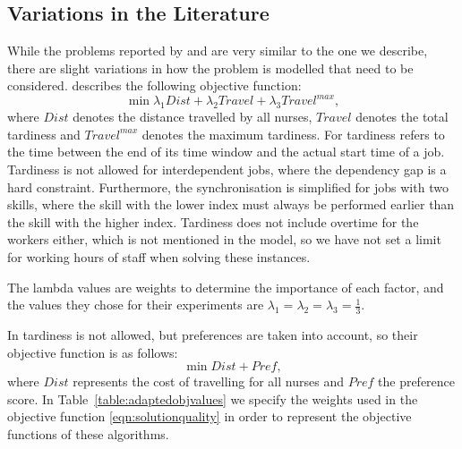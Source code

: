 \documentclass[a4paper,11pt,authoryear]{elsarticle}
\begin{document}
\subsection{Variations in the Literature}
\label{sub:literaturedata}
\noindent While the problems reported by \cite{mankowska2014} and \cite{aithaddadene2016} are very similar to the one we describe, there are slight variations in how the problem is modelled that need to be considered. \cite{mankowska2014} describes the following objective function:
\begin{equation}
    \min \lambda_1 Dist + \lambda_2 Travel + \lambda_3 Travel^{max},
\end{equation}
where $Dist$ denotes the distance travelled by all nurses, $Travel$ denotes the total tardiness and $Travel^{max}$ denotes the maximum tardiness. For \cite{mankowska2014} tardiness refers to the time between the end of its time window and the actual start time of a job. Tardiness is not allowed for interdependent jobs, where the dependency gap is a hard constraint. Furthermore, the synchronisation is simplified for jobs with two skills, where the skill with the lower index must always be performed earlier than the skill with the higher index.
Tardiness does not include overtime for the workers either, which is not mentioned in the model, so we have not set a limit for working hours of staff when solving these instances.

The lambda values are weights to determine the importance of each factor, and the values they chose for their experiments are $\lambda_1 = \lambda_2 = \lambda_3 = \frac{1}{3}$.

In \cite{aithaddadene2016} tardiness is not allowed, but preferences are taken into account, so their objective function is as follows:
\begin{equation}
    \min Dist + Pref,
\end{equation}
where $Dist$ represents the cost of travelling for all nurses and $Pref$ the preference score.
In Table~\ref{table:adaptedobjvalues} we specify the weights used in the objective function \eqref{eqn:solutionquality} in order to represent the objective functions of these algorithms.
\end{document}
